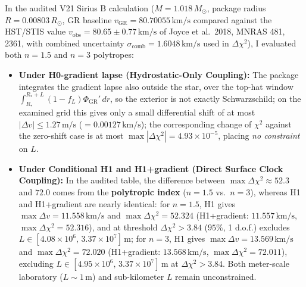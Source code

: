 \documentclass[10pt,a4paper]{article}
\begin{document}
\par
In the audited V21 Sirius B calculation ($M = 1.018\,M_\odot$, package radius $R = 0.00803\,R_\odot$, GR baseline $v_{\text{GR}} = 80.70055\,\text{km/s}$ compared against the HST/STIS value $v_{\text{obs}} = 80.65 \pm 0.77\,\text{km/s}$ of Joyce et al.\ 2018, MNRAS 481, 2361, with combined uncertainty $\sigma_{\text{comb}} = 1.6048\,\text{km/s}$ used in $\Delta\chi^2$), I evaluated both $n=1.5$ and $n=3$ polytropes:
\begin{itemize}\setlength{\itemsep}{1.5pt}\setlength{\parskip}{0pt}\setlength{\topsep}{1pt}
  \item \textbf{Under H0-gradient lapse (Hydrostatic-Only Coupling):} The package integrates the gradient lapse also outside the star, over the top-hat window $\int_{R_*}^{R_*+L}(1-f_L)\Phi_{\text{GR}}'\,dr$, so the exterior is not exactly Schwarzschild; on the examined grid this gives only a small differential shift of at most \textbf{$|\Delta v| \le 1.27\,\text{m/s}$} ($= 0.00127\,\text{km/s}$); the corresponding change of $\chi^2$ against the zero-shift case is at most $\max|\Delta\chi^2| = 4.93\times 10^{-5}$, placing \emph{no constraint} on $L$.
  \item \textbf{Under Conditional H1 and H1+gradient (Direct Surface Clock Coupling):} In the audited table, the difference between $\max\Delta\chi^2 \approx 52.3$ and $72.0$ comes from the \textbf{polytropic index} ($n=1.5$ vs.\ $n=3$), whereas H1 and H1+gradient are nearly identical: for \textbf{$n=1.5$}, H1 gives $\max\Delta v = 11.558\,\text{km/s}$ and $\max\Delta\chi^2 = 52.324$ (H1+gradient: $11.557\,\text{km/s}$, $\max\Delta\chi^2 = 52.316$), and at threshold $\Delta\chi^2 > 3.84$ ($95\%$, 1 d.o.f.) excludes \textbf{$L \in [4.08\times 10^6,\, 3.37\times 10^7]\,\text{m}$}; for \textbf{$n=3$}, H1 gives $\max\Delta v = 13.569\,\text{km/s}$ and $\max\Delta\chi^2 = 72.020$ (H1+gradient: $13.568\,\text{km/s}$, $\max\Delta\chi^2 = 72.011$), excluding \textbf{$L \in [4.95\times 10^6,\, 3.37\times 10^7]\,\text{m}$} at $\Delta\chi^2 > 3.84$. Both meter-scale laboratory ($L \sim 1\,\text{m}$) and sub-kilometer $L$ remain unconstrained.
\end{itemize}
\end{document}
